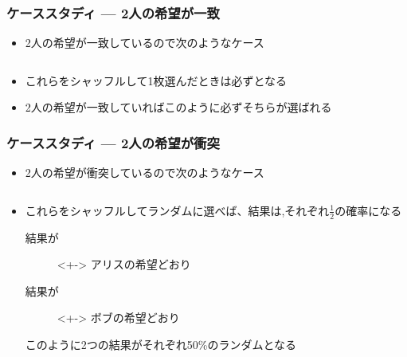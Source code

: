 \begin{frame}
  \frametitle{ケーススタディ --- 2人の希望が一致}

  \pause
  \begin{itemize}
    \item<+-> 2人の希望が一致しているので次のようなケース
      \begin{columns}
        \begin{column}{0.5\textwidth}
          \alicecallout{+}{\heartcard}
        \end{column}
        \begin{column}{0.5\textwidth}
          \bobcallout{-}{\heartcard}
        \end{column}
      \end{columns}

    \item<+-> これらをシャッフルして1枚選んだときは必ず\heartcard となる

    \item<+-> 2人の希望が一致していればこのように必ずそちらが選ばれる
  \end{itemize}
\end{frame}

\begin{frame}
  \frametitle{ケーススタディ --- 2人の希望が衝突}

  \begin{itemize}
    \item<+-> 2人の希望が衝突しているので次のようなケース
      \begin{columns}
        \begin{column}{0.5\textwidth}
          \alicecallout{+}{\heartcard}
        \end{column}
        \begin{column}{0.5\textwidth}
          \bobcallout{-}{\clubcard}
        \end{column}
      \end{columns}

    \item<+-> これらをシャッフルしてランダムに選べば、結果は\heartcard,\clubcard それぞれ$\frac{1}{2}$の確率になる
    \begin{description}
      \item[結果が\heartcard]<+-> アリスの希望どおり
      \item[結果が\clubcard]<+-> ボブの希望どおり
    \end{description}
    このように2つの結果がそれぞれ50\%のランダムとなる
  \end{itemize}
\end{frame}

